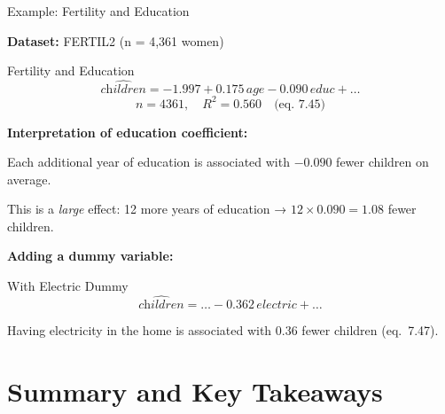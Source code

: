 \documentclass[aspectratio=169, 12pt]{beamer}
\begin{document}
\begin{frame}[shrink=25]{Example: Fertility and Education}

  \textbf{Dataset:} FERTIL2 (n = 4,361 women)

  \medskip

  \begin{examplebox}{Fertility and Education}
    \[
      \widehat{\textit{children}} = -1.997 + 0.175 \, \textit{age} - 0.090 \, \textit{educ} + \ldots
    \]
    \[
      n = 4361, \quad R^2 = 0.560 \quad \text{(eq.\ 7.45)}
    \]
  \end{examplebox}

  \medskip

  \textbf{Interpretation of education coefficient:}

  \begin{keybox}
    Each additional year of education is associated with $-0.090$ fewer children on average.

    This is a \textit{large} effect: 12 more years of education → $12 \times 0.090 = 1.08$ fewer children.
  \end{keybox}

  \medskip

  \textbf{Adding a dummy variable:}

  \medskip

  \begin{examplebox}{With Electric Dummy}
    \[
      \widehat{\textit{children}} = \ldots - 0.362 \, \textit{electric} + \ldots
    \]

    Having electricity in the home is associated with 0.36 fewer children (eq.\ 7.47).
  \end{examplebox}

\end{frame}

\section{Summary and Key Takeaways}
\end{document}
